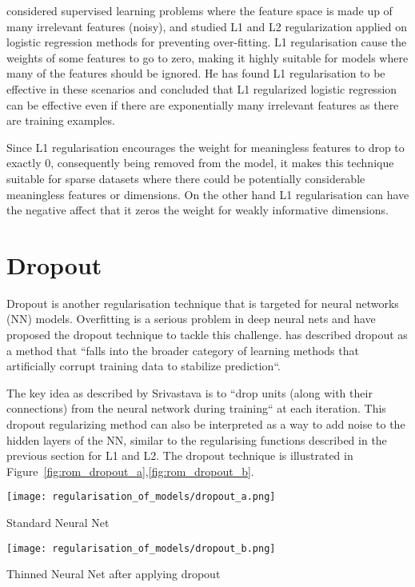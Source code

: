 \citet{ng2004feature} considered supervised learning problems where the feature space is made up of many irrelevant features (noisy), and studied L1 and L2 regularization applied on logistic regression methods for preventing over-ﬁtting. L1 regularisation cause the weights of some features to go to zero, making it highly suitable for models where many of the features should be ignored. He has found L1 regularisation to be effective in these scenarios and concluded that L1 regularized logistic regression can be effective even if there are exponentially many irrelevant features as there are training examples.


Since L1 regularisation encourages the weight for meaningless features to drop to exactly 0, consequently being removed from the model, it makes this technique suitable for sparse datasets where there could be potentially considerable meaningless features or dimensions. On the other hand L1 regularisation can have the negative affect that it zeros the weight for weakly informative dimensions. 


\section{Dropout} 

Dropout is another regularisation technique that is targeted for neural networks (NN) models. Overfitting is a serious problem in deep neural nets and\citet{srivastava2014dropout} have proposed the dropout technique to tackle this challenge. \citet{wager2013dropout} has described dropout as a method that ``falls into the broader category of learning methods that artiﬁcially corrupt training data to stabilize prediction``.

The key idea as described by Srivastava is to ``drop units (along with their connections) from the neural network during training`` at each iteration. This dropout regularizing method can also be interpreted as a way to add noise to the hidden layers of the NN, similar to the regularising functions described in the previous section for L1 and L2. The dropout technique is illustrated in Figure~\ref{fig:rom_dropout_a},\ref{fig:rom_dropout_b}. 

\begin{marginfigure}%
	\centering
	\texttt{[image: regularisation\_of\_models/dropout\_a.png]}
	\caption{Standard Neural Net}
	\label{fig:rom_dropout_a}
\end{marginfigure}
\begin{marginfigure}%
	\centering	
	\texttt{[image: regularisation\_of\_models/dropout\_b.png]}
	\caption{Thinned Neural Net after applying dropout}
	\label{fig:rom_dropout_b}
\end{marginfigure}


